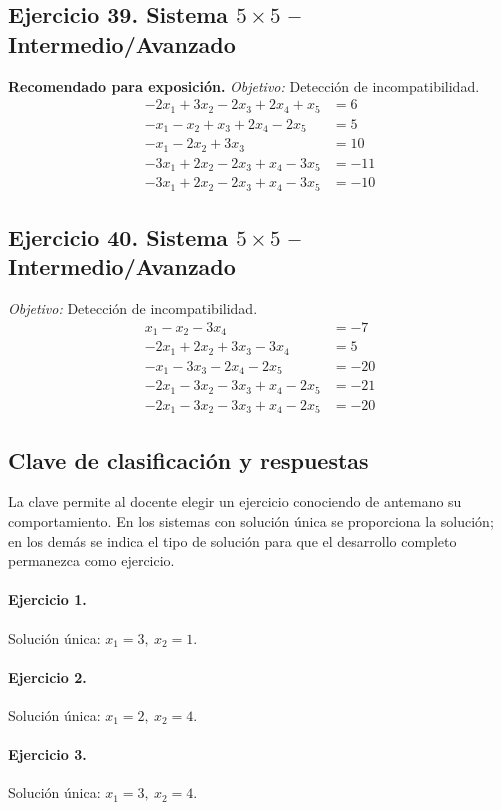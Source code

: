 \documentclass[12pt]{article}
\theoremstyle{remark}
\begin{document}
\subsection*{Ejercicio 39. Sistema $5\times5$ -- Intermedio/Avanzado}
\textbf{Recomendado para exposición.} \emph{Objetivo:} Detección de incompatibilidad.
\[
\begin{aligned}
- 2 x_{1} + 3 x_{2} - 2 x_{3} + 2 x_{4} + x_{5} &= 6\\
- x_{1} - x_{2} + x_{3} + 2 x_{4} - 2 x_{5} &= 5\\
- x_{1} - 2 x_{2} + 3 x_{3} &= 10\\
- 3 x_{1} + 2 x_{2} - 2 x_{3} + x_{4} - 3 x_{5} &= -11\\
- 3 x_{1} + 2 x_{2} - 2 x_{3} + x_{4} - 3 x_{5} &= -10
\end{aligned}
\]
\subsection*{Ejercicio 40. Sistema $5\times5$ -- Intermedio/Avanzado}
\emph{Objetivo:} Detección de incompatibilidad.
\[
\begin{aligned}
x_{1} - x_{2} - 3 x_{4} &= -7\\
- 2 x_{1} + 2 x_{2} + 3 x_{3} - 3 x_{4} &= 5\\
- x_{1} - 3 x_{3} - 2 x_{4} - 2 x_{5} &= -20\\
- 2 x_{1} - 3 x_{2} - 3 x_{3} + x_{4} - 2 x_{5} &= -21\\
- 2 x_{1} - 3 x_{2} - 3 x_{3} + x_{4} - 2 x_{5} &= -20
\end{aligned}
\]
\subsection*{Clave de clasificación y respuestas}
La clave permite al docente elegir un ejercicio conociendo de antemano su comportamiento. En los sistemas con solución única se proporciona la solución; en los demás se indica el tipo de solución para que el desarrollo completo permanezca como ejercicio.
\paragraph{Ejercicio 1.} Solución única: \(x_{1}=3,\ x_{2}=1\).
\paragraph{Ejercicio 2.} Solución única: \(x_{1}=2,\ x_{2}=4\).
\paragraph{Ejercicio 3.} Solución única: \(x_{1}=3,\ x_{2}=4\).
\end{document}
